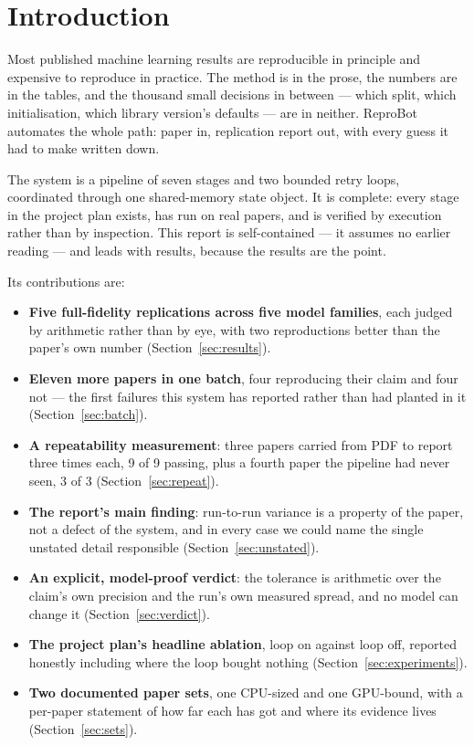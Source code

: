 \documentclass[11pt]{article}
\begin{document}
\section{Introduction}
\label{sec:intro}

Most published machine learning results are reproducible in principle and expensive to reproduce
in practice. The method is in the prose, the numbers are in the tables, and the thousand small
decisions in between --- which split, which initialisation, which library version's defaults ---
are in neither. ReproBot automates the whole path: paper in, replication report out, with every
guess it had to make written down.

The system is a pipeline of seven stages and two bounded retry loops, coordinated through one
shared-memory state object. It is complete: every stage in the project plan exists, has run on
real papers, and is verified by execution rather than by inspection. This report is
self-contained --- it assumes no earlier reading --- and leads with results, because the
results are the point.

Its contributions are:

\begin{itemize}
  \item \textbf{Five full-fidelity replications across five model families}, each judged by
    arithmetic rather than by eye, with two reproductions better than the paper's own number
    (Section~\ref{sec:results}).
  \item \textbf{Eleven more papers in one batch}, four reproducing their claim and four not ---
    the first failures this system has reported rather than had planted in it
    (Section~\ref{sec:batch}).
  \item \textbf{A repeatability measurement}: three papers carried from PDF to report three
    times each, 9 of 9 passing, plus a fourth paper the pipeline had never seen, 3 of 3
    (Section~\ref{sec:repeat}).
  \item \textbf{The report's main finding}: run-to-run variance is a property of the paper, not
    a defect of the system, and in every case we could name the single unstated detail
    responsible (Section~\ref{sec:unstated}).
  \item \textbf{An explicit, model-proof verdict}: the tolerance is arithmetic over the claim's
    own precision and the run's own measured spread, and no model can change it
    (Section~\ref{sec:verdict}).
  \item \textbf{The project plan's headline ablation}, loop on against loop off, reported
    honestly including where the loop bought nothing (Section~\ref{sec:experiments}).
  \item \textbf{Two documented paper sets}, one CPU-sized and one GPU-bound, with a per-paper
    statement of how far each has got and where its evidence lives (Section~\ref{sec:sets}).
\end{itemize}
\end{document}
